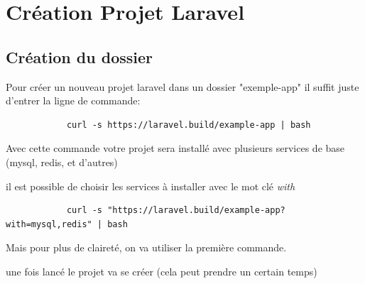 \documentclass[internal]{nhitec_design}
\begin{document}
\newpage

\section{Création Projet Laravel}

    \subsection{Création du dossier}
        Pour créer un nouveau projet laravel dans un dossier "exemple-app" il suffit juste d'entrer la ligne de commande:

        \begin{lstlisting}
            curl -s https://laravel.build/example-app | bash
        \end{lstlisting}

        Avec cette commande votre projet sera installé avec plusieurs services de base (mysql, redis, et d'autres)

        il est possible de choisir les services à installer avec le mot clé \textit{with}

        \begin{lstlisting}
            curl -s "https://laravel.build/example-app?with=mysql,redis" | bash
        \end{lstlisting}
        Mais pour plus de claireté, on va utiliser la première commande.

        une fois lancé le projet va se créer (cela peut prendre un certain temps)
\end{document}
